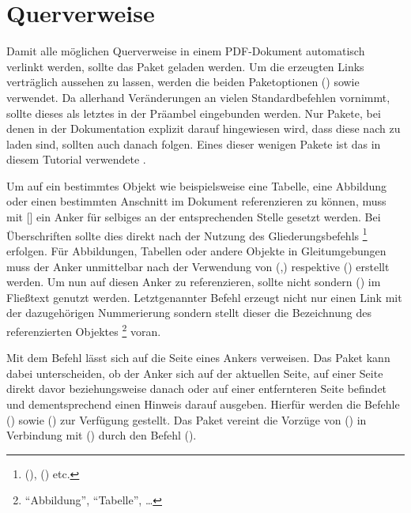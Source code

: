 \documentclass[%
  english,ngerman,%
  cdgeometry=no,DIV=12,automark,%
]{tudscrartcl}
\begin{document}
\section{Querverweise}
\label{sec:references}%
%
Damit alle möglichen Querverweise in einem PDF-Dokument automatisch verlinkt 
werden, sollte das Paket  geladen werden. Um die erzeugten 
Links verträglich aussehen zu lassen, werden die beiden Paketoptionen 
() sowie  
verwendet. Da  allerhand Veränderungen an vielen 
Standardbefehlen vornimmt, sollte dieses als letztes in der Präambel 
eingebunden werden. Nur Pakete, bei denen in der Dokumentation explizit darauf 
hingewiesen wird, dass diese nach  zu laden sind, sollten 
auch danach folgen. Eines dieser wenigen Pakete ist das in diesem Tutorial 
verwendete . 
%
\begin{Hint}
\usepackage[colorlinks,linkcolor=blue]{hyperref}

\end{Hint}
%
Um auf ein bestimmtes Objekt wie beispielsweise eine Tabelle, eine Abbildung 
oder einen bestimmten Anschnitt im Dokument referenzieren zu können, muss mit 
[] ein Anker für selbiges an der entsprechenden 
Stelle gesetzt werden. Bei Überschriften sollte dies direkt nach der Nutzung 
des Gliederungsbefehls%
\footnote{%
  (), 
  () etc.%
}
erfolgen. Für Abbildungen, Tabellen oder andere Objekte in Gleitumgebungen muss 
der Anker unmittelbar nach der Verwendung von 
(,) respektive 
() erstellt werden. Um nun auf diesen 
Anker zu referenzieren, sollte nicht  sondern 
() im Fließtext genutzt werden. Letztgenannter 
Befehl erzeugt nicht nur einen Link mit der dazugehörigen Nummerierung sondern 
stellt dieser die Bezeichnung des referenzierten Objektes%
\footnote{\enquote{Abbildung}, \enquote{Tabelle}, \dots}
voran. 

Mit dem Befehl  lässt sich auf die Seite eines Ankers verweisen. 
Das Paket  kann dabei unterscheiden, ob der Anker sich auf 
der aktuellen Seite, auf einer Seite direkt davor beziehungsweise danach oder 
auf einer entfernteren Seite befindet und dementsprechend einen Hinweis darauf 
ausgeben. Hierfür werden die Befehle () sowie 
() zur Verfügung gestellt. Das Paket 
 vereint die Vorzüge von () 
in Verbindung mit () durch den Befehl 
().
\end{document}
